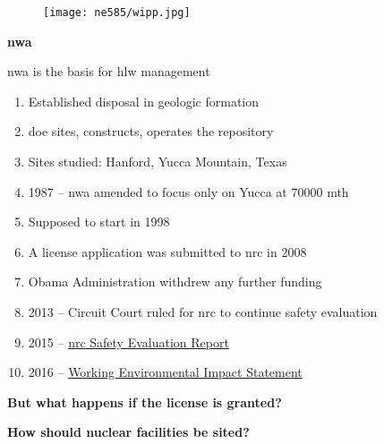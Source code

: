 \documentclass[aspectratio=1610,pdftex,dvipsnames,compress,xcolor={dvipsnames}]{beamer}
\newcommand{\acf}{\acrfull} %
\newcommand{\acl}{\acrlong} %
\newcommand{\acs}{\acrshort} %
\begin{document}
\begin{frame}{}
    \begin{figure}
        \centering
        \texttt{[image: ne585/wipp.jpg]}
    \end{figure}
\end{frame}


\begin{frame}[plain]{}
    \centering\LARGE\textbf{\acf{nwa}}
\end{frame}


\addtocounter{framenumber}{-1} 
\begin{frame}{\acl{nwa} is the basis for \acs{hlw} management}
    \begin{enumerate}[series=outerlist,topsep=0pt,itemsep=7pt,leftmargin=*,label=(\arabic*)]
        \item[]Established disposal in geologic formation
        \item[]\acs{doe} sites, constructs, operates the repository
        \item[]Sites studied: Hanford, Yucca Mountain, Texas
        \item[]1987 -- \acs{nwa} amended to focus only on Yucca at 70000 \acs{mth}
        \item[]Supposed to start in 1998
        \item[]A license application was submitted to \acs{nrc} in 2008
        \item[]Obama Administration withdrew any further funding
        \item[]2013 -- Circuit Court ruled for \acs{nrc} to continue safety evaluation
        \item[]2015 -- \href{https://www.nrc.gov/reading-rm/doc-collections/nuregs/staff/sr1949/index.html}{\acs{nrc} Safety Evaluation Report}
        \item[]2016 -- \href{https://www.nrc.gov/waste/hlw-disposal/key-documents.html}{Working Environmental Impact Statement}
    \end{enumerate}
\end{frame}

\begin{frame}[plain]{}
    \centering\LARGE\textbf{But what happens if the license is granted?}
\end{frame}


\begin{frame}[plain]{}
    \centering\LARGE\textbf{How should nuclear facilities be sited?}
\end{frame}
\end{document}
